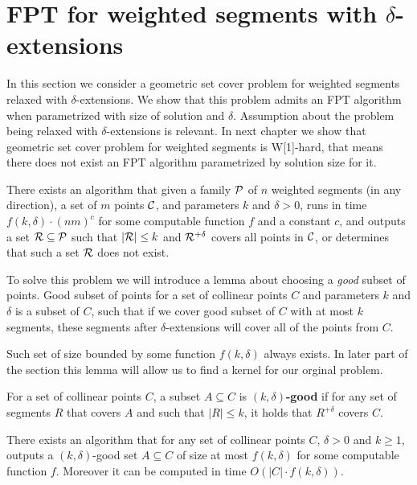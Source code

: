 \section{FPT for weighted segments with $\delta$-extensions}

In this section we consider a geometric set cover problem
for weighted segments relaxed with $\delta$-extensions.
We show that this problem
admits an FPT algorithm when parametrized with size
of solution and $\delta$.
Assumption about the problem being relaxed with $\delta$-extensions is relevant.
In next chapter we show that geometric set cover problem
for weighted segments is W[1]-hard, that means
there does not exist an FPT algorithm parametrized by solution size for it.

\begin{tw}{
	\label{fpt_weighted_segment}
	There exists an algorithm that given a family $\mathcal{P}$ of
	$n$ weighted segments (in any direction),
	a set of $m$ points $\mathcal{C}$, and parameters $k$ and $\delta > 0$,
	runs in time $f(k, \delta) \cdot (nm)^c$ for some computable function $f$ and a constant $c$,
	and outputs a set $\mathcal{R} \subseteq \mathcal{P}$
	such that $|\mathcal{R}| \le k$ and $\mathcal{R}^{+\delta}$ covers all points in $\mathcal{C}$,
	or determines that such a set $\mathcal{R}$ does not exist.
}\end{tw}


To solve this problem we will introduce a lemma about choosing
a \textit{good} subset of points. Good subset of points
for a set of collinear points $C$ and parameters $k$ and $\delta$
is a subset of $C$, such that
if we cover good subset of $C$ with at most $k$ segments,
these segments after $\delta$-extensions will cover all of the points from $C$.

Such set of size bounded by some function $f(k, \delta)$ always exists.
In later part of the section this lemma will allow us to find a kernel
for our orginal problem.

\begin{defi}
	For a set of collinear points $C$,
	a subset $A \subseteq C$ is \textbf{$(k,\delta)$-good} 
	if for any set of segments $R$ that covers $A$ and
	such that $|R| \le k$, it holds that $R^{+\delta}$ covers $C$.
\end{defi}

\begin{lemma}
	\label{good_set_exists}
	There exists an algorithm that
	for any set of collinear points $C$, $\delta > 0$ and $k \ge 1$,
	outputs a $(k,\delta)$-good set $A \subseteq C$ of size at most $f(k, \delta)$
	for some computable function $f$. Moreover it can be computed in time
	$O(|C| \cdot f(k, \delta))$.
\end{lemma}


